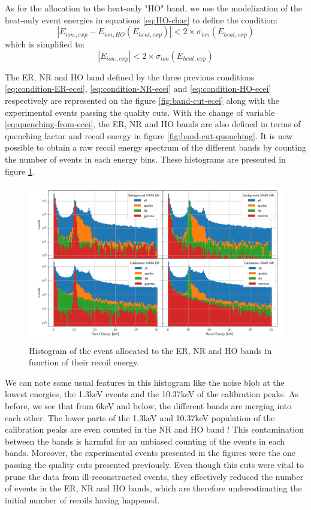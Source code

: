 As for the allocation to the heat-only "HO" band, we use the modelization of the heat-only event energies in equations \ref{eq:HO-char} to define the condition:
\begin{equation}
|E_{ion., exp} - E_{ion, HO}(E_{heat, exp})| < 2 \times \sigma_{ion}\left( E_{heat, exp}\right)
\end{equation}
which is simplified to:
\begin{equation}
\label{eq:condition-HO-ecei}
|E_{ion., exp}| < 2 \times \sigma_{ion}\left( E_{heat, exp}\right)
\end{equation}

The ER, NR and HO band defined by the three previous conditions \ref{eq:condition-ER-ecei}, \ref{eq:condition-NR-ecei} and \ref{eq:condition-HO-ecei} respectively are represented on the figure \ref{fig:band-cut-ecei} along with the experimental events passing the quality cuts. With the change of variable \ref{eq:quenching-from-ecei}, the ER, NR and HO bands are also defined in terms of quenching factor and recoil energy in figure \ref{fig:band-cut-quenching}. 
It is now possible to obtain a raw recoil energy spectrum of the different bands by counting the number of events in each energy bins. These histograms are presented in figure \ref{fig:raw-hist}.

\begin{figure}
\centering
\includegraphics[width=\linewidth,]{Figures/Neutron/cut_hist_data.png}
\caption{Histogram of the event allocated to the ER, NR and HO bands in function of their recoil energy.}
\label{fig:raw-hist}
\end{figure}

We can note some usual features in this histogram like the noise blob at the lowest energies, the 1.3keV events and the 10.37keV of the calibration peaks. As before, we see that from 6keV and below, the different bands are merging into each other. The lower parts of the 1.3keV and 10.37keV population of the calibration peaks are even counted in the NR and HO band !
This contamination between the bands is harmful for an unbiased counting of the events in each bands.
Moreover, the experimental events presented in the figures were the one passing the quality cuts presented previously. Even though this cuts were vital to prune the data from ill-reconstructed events, they effectively reduced the number of events in the ER, NR and HO bands, which are therefore underestimating the initial number of recoils having happened.


